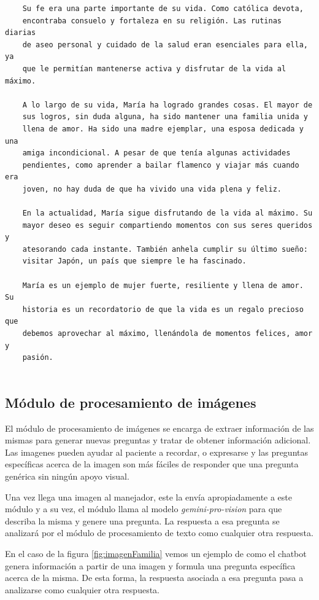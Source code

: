 \begin{verbatim}
	Su fe era una parte importante de su vida. Como católica devota,
	encontraba consuelo y fortaleza en su religión. Las rutinas diarias
	de aseo personal y cuidado de la salud eran esenciales para ella, ya
	que le permitían mantenerse activa y disfrutar de la vida al máximo.
	
	A lo largo de su vida, María ha logrado grandes cosas. El mayor de
	sus logros, sin duda alguna, ha sido mantener una familia unida y
	llena de amor. Ha sido una madre ejemplar, una esposa dedicada y una
	amiga incondicional. A pesar de que tenía algunas actividades
	pendientes, como aprender a bailar flamenco y viajar más cuando era
	joven, no hay duda de que ha vivido una vida plena y feliz.
	
	En la actualidad, María sigue disfrutando de la vida al máximo. Su
	mayor deseo es seguir compartiendo momentos con sus seres queridos y
	atesorando cada instante. También anhela cumplir su último sueño:
	visitar Japón, un país que siempre le ha fascinado.
	
	María es un ejemplo de mujer fuerte, resiliente y llena de amor. Su
	historia es un recordatorio de que la vida es un regalo precioso que
	debemos aprovechar al máximo, llenándola de momentos felices, amor y
	pasión.
	
\end{verbatim}

\subsection{Módulo de procesamiento de imágenes}
\label{procesamientoimagenes}
El módulo de procesamiento de imágenes se encarga de extraer información de las mismas para generar nuevas preguntas y tratar de obtener información adicional. Las imagenes pueden ayudar al paciente a recordar, o expresarse y las preguntas específicas acerca de la imagen son más fáciles de responder que una pregunta genérica sin ningún apoyo visual. 

Una vez llega una imagen al manejador, este la envía apropiadamente a este módulo y a su vez, el módulo llama al modelo  \textit{gemini-pro-vision} para que describa la misma y genere una pregunta. La respuesta a esa pregunta se analizará por el módulo de procesamiento de texto como cualquier otra respuesta. 

En el caso de la figura \ref{fig:imagenFamilia} vemos un ejemplo de como el chatbot genera información a partir de una imagen y formula una pregunta específica acerca de la misma. De esta forma, la respuesta asociada a esa pregunta pasa a analizarse como cualquier otra respuesta. 

